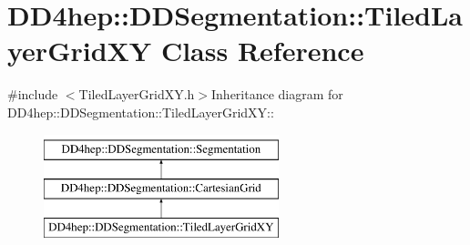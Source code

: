 \hypertarget{class_d_d4hep_1_1_d_d_segmentation_1_1_tiled_layer_grid_x_y}{
\section{DD4hep::DDSegmentation::TiledLayerGridXY Class Reference}
\label{class_d_d4hep_1_1_d_d_segmentation_1_1_tiled_layer_grid_x_y}
}


{\ttfamily \#include $<$TiledLayerGridXY.h$>$}Inheritance diagram for DD4hep::DDSegmentation::TiledLayerGridXY::\begin{figure}[H]
\begin{center}
\leavevmode
\includegraphics[height=3cm]{class_d_d4hep_1_1_d_d_segmentation_1_1_tiled_layer_grid_x_y}
\end{center}
\end{figure}

